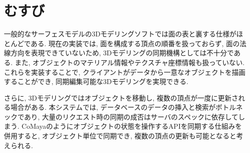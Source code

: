\chapter{むすび} \label{chap:conclusion}
一般的なサーフェスモデルの3Dモデリングソフトでは面の表と裏する仕様がほとんどである.
現在の実装では, 面を構成する頂点の順番を扱っておらず, 面の法線方向を表現できていないため, 3Dモデリングの同期機構としては不十分である. また, オブジェクトのマテリアル情報やテクスチャ座標情報も扱っていない.
これらを実装することで, クライアントがデータから一意なオブジェクトを描画することができ, 同期編集可能な3Dモデリングを実現できる.

さらに, 3Dモデリングではオブジェクトを移動し, 複数の頂点が一度に更新される場合がある. 本システムでは, データベースのデータの挿入と検索がボトルネックであり, 大量のリクエスト時の同期の成否はサーバのスペックに依存してしまう. CoMayaのようにオブジェクトの状態を操作するAPIを同期する仕組みを併用すると, オブジェクト単位で同期でき, 複数の頂点の更新も可能となると考えられる.

